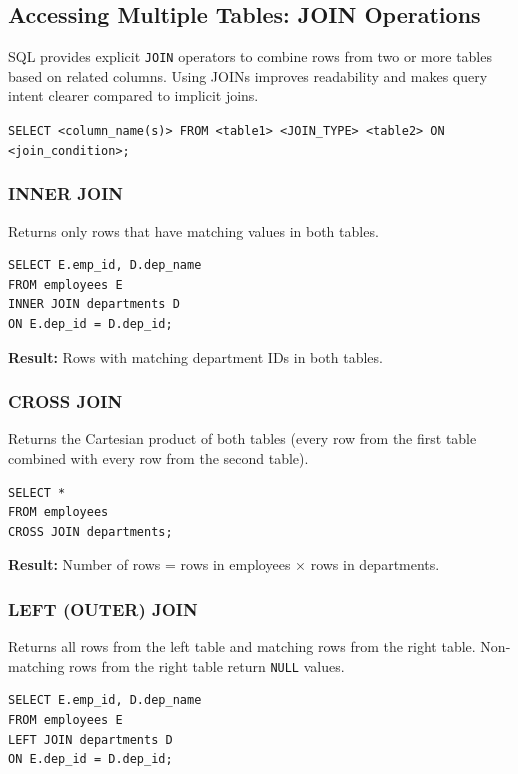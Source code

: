 \documentclass{article}
\begin{document}
\subsection{Accessing Multiple Tables: JOIN Operations}

SQL provides explicit \texttt{JOIN} operators to combine rows from two or more tables based on related columns.  
Using JOINs improves readability and makes query intent clearer compared to implicit joins.

\begin{FormulaBox}
\texttt{SELECT <column\_name(s)> 
FROM <table1> <JOIN\_TYPE> <table2>
ON <join\_condition>;}
\end{FormulaBox}

\subsubsection{INNER JOIN}

Returns only rows that have matching values in both tables.

\begin{verbatim}
SELECT E.emp_id, D.dep_name
FROM employees E
INNER JOIN departments D
ON E.dep_id = D.dep_id;
\end{verbatim}

\textbf{Result:} Rows with matching department IDs in both tables.

\subsubsection{CROSS JOIN}

Returns the Cartesian product of both tables (every row from the first table combined with every row from the second table).

\begin{verbatim}
SELECT *
FROM employees
CROSS JOIN departments;
\end{verbatim}

\textbf{Result:} Number of rows = rows in employees × rows in departments.

\subsubsection{LEFT (OUTER) JOIN}

Returns all rows from the left table and matching rows from the right table.  
Non-matching rows from the right table return \texttt{NULL} values.

\begin{verbatim}
SELECT E.emp_id, D.dep_name
FROM employees E
LEFT JOIN departments D
ON E.dep_id = D.dep_id;
\end{verbatim}
\end{document}
